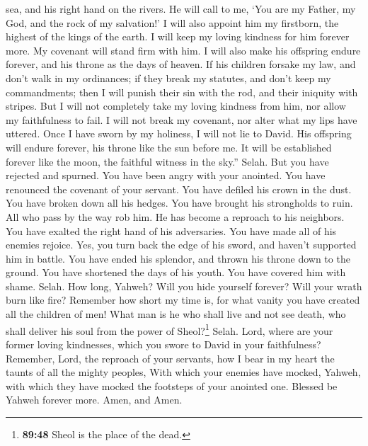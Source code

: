 sea, and his right hand on the rivers.  He will call to
me, `You are my Father, my God, and the rock of my salvation!'
 I will also appoint him my firstborn, the highest of the
kings of the earth.  I will keep my loving kindness for
him forever more. My covenant will stand firm with him. 
I will also make his offspring endure forever, and his throne as the
days of heaven.  If his children forsake my law, and
don't walk in my ordinances;  if they break my statutes,
and don't keep my commandments;  then I will punish their
sin with the rod, and their iniquity with stripes.  But I
will not completely take my loving kindness from him, nor allow my
faithfulness to fail.  I will not break my covenant, nor
alter what my lips have uttered.  Once I have sworn by my
holiness, I will not lie to David.  His offspring will
endure forever, his throne like the sun before me.  It
will be established forever like the moon, the faithful witness in the
sky.'' Selah.  But you have rejected and spurned. You
have been angry with your anointed.  You have renounced
the covenant of your servant. You have defiled his crown in the dust.
 You have broken down all his hedges. You have brought
his strongholds to ruin.  All who pass by the way rob
him. He has become a reproach to his neighbors.  You have
exalted the right hand of his adversaries. You have made all of his
enemies rejoice.  Yes, you turn back the edge of his
sword, and haven't supported him in battle.  You have
ended his splendor, and thrown his throne down to the ground.
 You have shortened the days of his youth. You have
covered him with shame. Selah.  How long, Yahweh? Will
you hide yourself forever? Will your wrath burn like fire?
 Remember how short my time is, for what vanity you have
created all the children of men!  What man is he who
shall live and not see death, who shall deliver his soul from the power
of Sheol?\footnote{\textbf{89:48} Sheol is the place of the dead.}
Selah.  Lord, where are your former loving kindnesses,
which you swore to David in your faithfulness?  Remember,
Lord, the reproach of your servants, how I bear in my heart the taunts
of all the mighty peoples,  With which your enemies have
mocked, Yahweh, with which they have mocked the footsteps of your
anointed one.  Blessed be Yahweh forever more. Amen, and
Amen.

